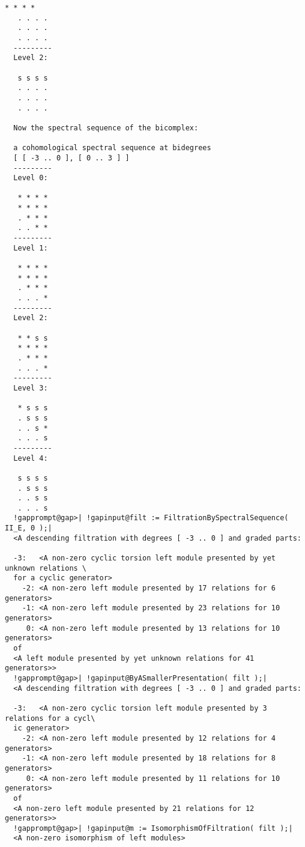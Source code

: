 \documentclass[a4paper,11pt]{report}
\begin{document}
{{{\begin{Verbatim}[commandchars=!@|,fontsize=\small,frame=single,label=Example]
   * * * *
   . . . .
   . . . .
   . . . .
  ---------
  Level 2:
  
   s s s s
   . . . .
   . . . .
   . . . .
  
  Now the spectral sequence of the bicomplex:
  
  a cohomological spectral sequence at bidegrees
  [ [ -3 .. 0 ], [ 0 .. 3 ] ]
  ---------
  Level 0:
  
   * * * *
   * * * *
   . * * *
   . . * *
  ---------
  Level 1:
  
   * * * *
   * * * *
   . * * *
   . . . *
  ---------
  Level 2:
  
   * * s s
   * * * *
   . * * *
   . . . *
  ---------
  Level 3:
  
   * s s s
   . s s s
   . . s *
   . . . s
  ---------
  Level 4:
  
   s s s s
   . s s s
   . . s s
   . . . s
  !gapprompt@gap>| !gapinput@filt := FiltrationBySpectralSequence( II_E, 0 );|
  <A descending filtration with degrees [ -3 .. 0 ] and graded parts:
  
  -3:	<A non-zero cyclic torsion left module presented by yet unknown relations \
  for a cyclic generator>
    -2:	<A non-zero left module presented by 17 relations for 6 generators>
    -1:	<A non-zero left module presented by 23 relations for 10 generators>
     0:	<A non-zero left module presented by 13 relations for 10 generators>
  of
  <A left module presented by yet unknown relations for 41 generators>>
  !gapprompt@gap>| !gapinput@ByASmallerPresentation( filt );|
  <A descending filtration with degrees [ -3 .. 0 ] and graded parts:
  
  -3:	<A non-zero cyclic torsion left module presented by 3 relations for a cycl\
  ic generator>
    -2:	<A non-zero left module presented by 12 relations for 4 generators>
    -1:	<A non-zero left module presented by 18 relations for 8 generators>
     0:	<A non-zero left module presented by 11 relations for 10 generators>
  of
  <A non-zero left module presented by 21 relations for 12 generators>>
  !gapprompt@gap>| !gapinput@m := IsomorphismOfFiltration( filt );|
  <A non-zero isomorphism of left modules>
\end{Verbatim}
 }

 
}}
\end{document}
